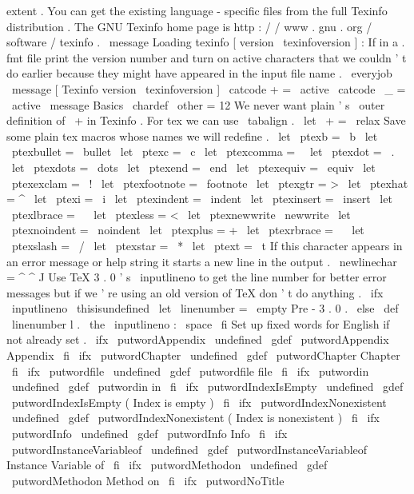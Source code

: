 %
extent
.
You
can
get
the
existing
language
-
specific
files
from
the
%
full
Texinfo
distribution
.
%
%
The
GNU
Texinfo
home
page
is
http
:
/
/
www
.
gnu
.
org
/
software
/
texinfo
.
\
message
{
Loading
texinfo
[
version
\
texinfoversion
]
:
}
%
If
in
a
.
fmt
file
print
the
version
number
%
and
turn
on
active
characters
that
we
couldn
'
t
do
earlier
because
%
they
might
have
appeared
in
the
input
file
name
.
\
everyjob
{
\
message
{
[
Texinfo
version
\
texinfoversion
]
}
%
\
catcode
+
=
\
active
\
catcode
\
_
=
\
active
}
\
message
{
Basics
}
\
chardef
\
other
=
12
%
We
never
want
plain
'
s
\
outer
definition
of
\
+
in
Texinfo
.
%
For
tex
we
can
use
\
tabalign
.
\
let
\
+
=
\
relax
%
Save
some
plain
tex
macros
whose
names
we
will
redefine
.
\
let
\
ptexb
=
\
b
\
let
\
ptexbullet
=
\
bullet
\
let
\
ptexc
=
\
c
\
let
\
ptexcomma
=
\
\
let
\
ptexdot
=
\
.
\
let
\
ptexdots
=
\
dots
\
let
\
ptexend
=
\
end
\
let
\
ptexequiv
=
\
equiv
\
let
\
ptexexclam
=
\
!
\
let
\
ptexfootnote
=
\
footnote
\
let
\
ptexgtr
=
>
\
let
\
ptexhat
=
^
\
let
\
ptexi
=
\
i
\
let
\
ptexindent
=
\
indent
\
let
\
ptexinsert
=
\
insert
\
let
\
ptexlbrace
=
\
{
\
let
\
ptexless
=
<
\
let
\
ptexnewwrite
\
newwrite
\
let
\
ptexnoindent
=
\
noindent
\
let
\
ptexplus
=
+
\
let
\
ptexrbrace
=
\
}
\
let
\
ptexslash
=
\
/
\
let
\
ptexstar
=
\
*
\
let
\
ptext
=
\
t
%
If
this
character
appears
in
an
error
message
or
help
string
it
%
starts
a
new
line
in
the
output
.
\
newlinechar
=
^
^
J
%
Use
TeX
3
.
0
'
s
\
inputlineno
to
get
the
line
number
for
better
error
%
messages
but
if
we
'
re
using
an
old
version
of
TeX
don
'
t
do
anything
.
%
\
ifx
\
inputlineno
\
thisisundefined
\
let
\
linenumber
=
\
empty
%
Pre
-
3
.
0
.
\
else
\
def
\
linenumber
{
l
.
\
the
\
inputlineno
:
\
space
}
\
fi
%
Set
up
fixed
words
for
English
if
not
already
set
.
\
ifx
\
putwordAppendix
\
undefined
\
gdef
\
putwordAppendix
{
Appendix
}
\
fi
\
ifx
\
putwordChapter
\
undefined
\
gdef
\
putwordChapter
{
Chapter
}
\
fi
\
ifx
\
putwordfile
\
undefined
\
gdef
\
putwordfile
{
file
}
\
fi
\
ifx
\
putwordin
\
undefined
\
gdef
\
putwordin
{
in
}
\
fi
\
ifx
\
putwordIndexIsEmpty
\
undefined
\
gdef
\
putwordIndexIsEmpty
{
(
Index
is
empty
)
}
\
fi
\
ifx
\
putwordIndexNonexistent
\
undefined
\
gdef
\
putwordIndexNonexistent
{
(
Index
is
nonexistent
)
}
\
fi
\
ifx
\
putwordInfo
\
undefined
\
gdef
\
putwordInfo
{
Info
}
\
fi
\
ifx
\
putwordInstanceVariableof
\
undefined
\
gdef
\
putwordInstanceVariableof
{
Instance
Variable
of
}
\
fi
\
ifx
\
putwordMethodon
\
undefined
\
gdef
\
putwordMethodon
{
Method
on
}
\
fi
\
ifx
\
putwordNoTitle
